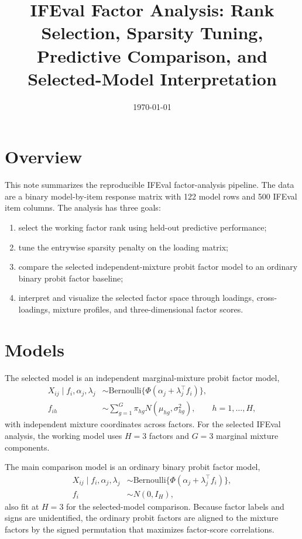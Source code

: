 \documentclass[11pt]{article}
\title{IFEval Factor Analysis: Rank Selection, Sparsity Tuning, Predictive Comparison, and Selected-Model Interpretation}
\author{}
\date{\today}
\begin{document}
\maketitle

\section{Overview}

This note summarizes the reproducible IFEval factor-analysis pipeline. The data are a binary
model-by-item response matrix with 122 model rows and 500 IFEval item columns. The analysis has
three goals:
\begin{enumerate}
  \item select the working factor rank using held-out predictive performance;
  \item tune the entrywise sparsity penalty on the loading matrix;
  \item compare the selected independent-mixture probit factor model to an ordinary binary probit
        factor baseline;
  \item interpret and visualize the selected factor space through loadings, cross-loadings,
        mixture profiles, and three-dimensional factor scores.
\end{enumerate}

\section{Models}

The selected model is an independent marginal-mixture probit factor model,
\begin{align}
X_{ij} \mid f_i, \alpha_j, \lambda_j
  &\sim \mathrm{Bernoulli}\{\Phi(\alpha_j + \lambda_j^\top f_i)\}, \\
f_{ih}
  &\sim \sum_{g=1}^{G} \pi_{hg} N(\mu_{hg}, \sigma_{hg}^2),
  \qquad h=1,\ldots,H,
\end{align}
with independent mixture coordinates across factors. For the selected IFEval analysis, the
working model uses $H=3$ factors and $G=3$ marginal mixture components.

The main comparison model is an ordinary binary probit factor model,
\begin{align}
X_{ij} \mid f_i, \alpha_j, \lambda_j
  &\sim \mathrm{Bernoulli}\{\Phi(\alpha_j + \lambda_j^\top f_i)\}, \\
f_i &\sim N(0, I_H),
\end{align}
also fit at $H=3$ for the selected-model comparison. Because factor labels and signs are
unidentified, the ordinary probit factors are aligned to the mixture factors by the signed
permutation that maximizes factor-score correlations.
\end{document}

